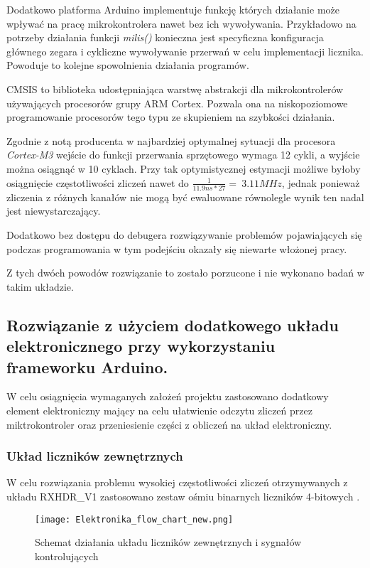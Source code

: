Dodatkowo platforma Arduino implementuje funkcję których działanie może wpływać na pracę mikrokontrolera nawet bez ich wywoływania. 
Przykładowo na potrzeby działania funkcji \textit{milis()} konieczna jest specyficzna konfiguracja głównego zegara i cykliczne wywoływanie przerwań w celu implementacji licznika. Powoduje to kolejne spowolnienia działania programów. 


CMSIS to biblioteka udostępniająca warstwę abstrakcji dla mikrokontrolerów używających procesorów grupy ARM Cortex. 
Pozwala ona na niskopoziomowe programowanie procesorów tego typu ze skupieniem na szybkości działania.

Zgodnie z notą producenta \cite{interupt latency} w najbardziej optymalnej sytuacji dla procesora \textit{Cortex-M3} wejście do funkcji przerwania sprzętowego wymaga 12 cykli, a wyjście można osiągnąć w 10 cyklach. 
Przy tak optymistycznej estymacji możliwe byłoby osiągnięcie częstotliwości zliczeń nawet do $\frac{1}{11.9ns*27} = ~ 3.11 MHz$, jednak ponieważ zliczenia z różnych kanałów nie mogą być ewaluowane równolegle wynik ten nadal jest niewystarczający. 

Dodatkowo bez dostępu do debugera rozwiązywanie problemów pojawiających się podczas programowania w tym podejściu okazały się niewarte włożonej pracy. 

Z tych dwóch powodów rozwiązanie to zostało porzucone i nie wykonano badań w takim układzie. 

\subsection{Rozwiązanie z użyciem dodatkowego układu elektronicznego przy wykorzystaniu frameworku Arduino.}

W celu osiągnięcia wymaganych założeń projektu zastosowano dodatkowy element elektroniczny mający na celu ułatwienie odczytu zliczeń przez miktrokontroler oraz przeniesienie części z obliczeń na układ elektroniczny.  

\subsubsection{Układ liczników zewnętrznych}
\label{section licziki}

W celu rozwiązania problemu wysokiej częstotliwości zliczeń otrzymywanych z układu RXHDR\_V1 \cite{master} zastosowano zestaw ośmiu binarnych liczników 4-bitowych \cite{licznik doc}. 


\begin{figure}[h]
        \centering
        \texttt{[image: Elektronika\_flow\_chart\_new.png]}
        \caption{Schemat działania układu liczników zewnętrznych i sygnałów kontrolujących}
        \label{licznik flowchart}
\end{figure}

